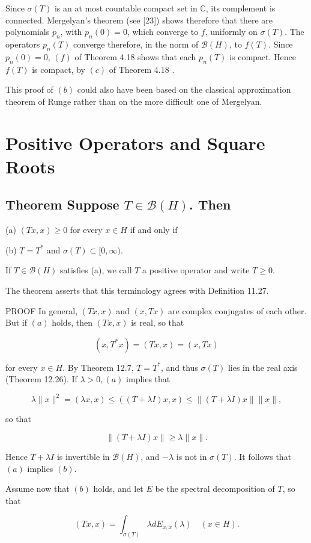 \documentclass[10pt]{article}
\begin{document}
Since $\sigma(T)$ is an at most countable compact set in $\mathbb{C}$, its complement is connected. Mergelyan's theorem (see [23]) shows therefore that there are polynomials $p_{n}$, with $p_{n}(0)=0$, which converge to $f$, uniformly on $\sigma(T)$. The operators $p_{n}(T)$ converge therefore, in the norm of $\mathscr{B}(H)$, to $f(T)$. Since $p_{n}(0)=0$, $(f)$ of Theorem 4.18 shows that each $p_{n}(T)$ is compact. Hence $f(T)$ is compact, by $(c)$ of Theorem 4.18 .

This proof of $(b)$ could also have been based on the classical approximation theorem of Runge rather than on the more difficult one of Mergelyan.

\section{Positive Operators and Square Roots}
\subsection{Theorem Suppose $T \in \mathscr{B}(H)$. Then}
(a) $(T x, x) \geq 0$ for every $x \in H$ if and only if

(b) $T=T^{*}$ and $\sigma(T) \subset[0, \infty)$.

If $T \in \mathscr{B}(H)$ satisfies (a), we call $T$ a positive operator and write $T \geq 0$.

The theorem asserts that this terminology agrees with Definition 11.27.

PROOF In general, $(T x, x)$ and $(x, T x)$ are complex conjugates of each other. But if $(a)$ holds, then $(T x, x)$ is real, so that

$$
\left(x, T^{*} x\right)=(T x, x)=(x, T x)
$$

for every $x \in H$. By Theorem 12.7, $T=T^{*}$, and thus $\sigma(T)$ lies in the real axis (Theorem 12.26). If $\lambda>0,(a)$ implies that

$$
\lambda\|x\|^{2}=(\lambda x, x) \leq((T+\lambda I) x, x) \leq\|(T+\lambda I) x\|\|x\|,
$$

so that

$$
\|(T+\lambda I) x\| \geq \lambda\|x\| .
$$

Hence $T+\lambda I$ is invertible in $\mathscr{B}(H)$, and $-\lambda$ is not in $\sigma(T)$. It follows that $(a)$ implies $(b)$.

Assume now that $(b)$ holds, and let $E$ be the spectral decomposition of $T$, so that

$$
(T x, x)=\int_{\sigma(T)} \lambda d E_{x, x}(\lambda) \quad(x \in H) .
$$
\end{document}
